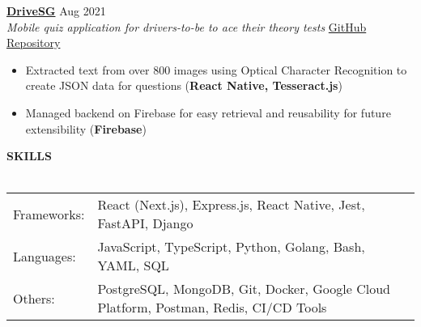 \documentclass[a4paper]{article}
\newcommand{\lineunder} {
    \vspace*{-8pt} \\
    \hspace*{-12pt} \hrulefill \\
}
\newcommand{\header} [1] {
    {\hspace*{-12pt}\vspace*{6pt} \large\textbf{#1}}
    \vspace*{-6pt} \lineunder
}
\begin{document}
\textbf{\href{https://play.google.com/store/apps/details?id=com.jianrong7.drivesg}{DriveSG}} \hfill Aug 2021\\
\textit{Mobile quiz application for drivers-to-be to ace their theory tests} \hfill \href{https://github.com/jianrong7/drivesg}{GitHub Repository}\\
\vspace{-2mm}
\begin{itemize} \itemsep 1pt
    \item Extracted text from over 800 images using Optical Character Recognition to create JSON data for questions (\textbf{React Native, Tesseract.js})
    \item Managed backend on Firebase for easy retrieval and reusability for future extensibility (\textbf{Firebase})
\end{itemize}

\header{SKILLS}
\vspace{1mm}
\begin{tabular}{ l l }
	Frameworks: & React (Next.js), Express.js, React Native, Jest, FastAPI, Django              \\
	Languages:  & JavaScript, TypeScript, Python, Golang, Bash, YAML, SQL                                \\
	Others:     & PostgreSQL, MongoDB, Git, Docker, Google Cloud Platform, Postman, Redis, CI/CD Tools   \\
\end{tabular}
\end{document}

